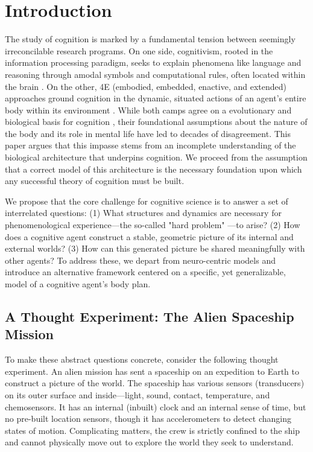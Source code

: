 \section{Introduction}
\label{sec:introduction}
The study of cognition is marked by a fundamental tension between seemingly irreconcilable research programs. On one side, cognitivism, rooted in the information processing paradigm, seeks to explain phenomena like language and reasoning through amodal symbols and computational rules, often located within the brain \cite{chomsky1965aspects, fodor_modularity_1983}. On the other, 4E (embodied, embedded, enactive, and extended) approaches ground cognition in the dynamic, situated actions of an agent's entire body within its environment \cite{varela1991embodied,  maturana1991autopoiesis, noe_action_2004}. While both camps agree on a evolutionary and biological basis for cognition \cite{chomsky1965aspects, varela1991embodied}, their foundational assumptions about the nature of the body and its role in mental life have led to decades of disagreement. This paper argues that this impasse stems from an incomplete understanding of the biological architecture that underpins cognition. We proceed from the assumption that a correct model of this architecture is the necessary foundation upon which any successful theory of cognition must be built.

We propose that the core challenge for cognitive science is to answer a set of interrelated questions: (1) What structures and dynamics are necessary for phenomenological experience—the so-called "hard problem" \cite{chalmers1995facing}—to arise? (2) How does a cognitive agent construct a stable, geometric picture of its internal and external worlds? (3) How can this generated picture be shared meaningfully with other agents? To address these, we depart from neuro-centric models and introduce an alternative framework centered on a specific, yet generalizable, model of a cognitive agent's body plan.

\subsection{A Thought Experiment: The Alien Spaceship Mission}
To make these abstract questions concrete, consider the following thought experiment. An alien mission has sent a spaceship on an expedition to Earth to construct a picture of the world. The spaceship has various sensors (transducers) on its outer surface and inside—light, sound, contact, temperature, and chemosensors. It has an internal (inbuilt) clock and an internal sense of time, but no pre-built location sensors, though it has accelerometers to detect changing states of motion. Complicating matters, the crew is strictly confined to the ship and cannot physically move out to explore the world they seek to understand.

